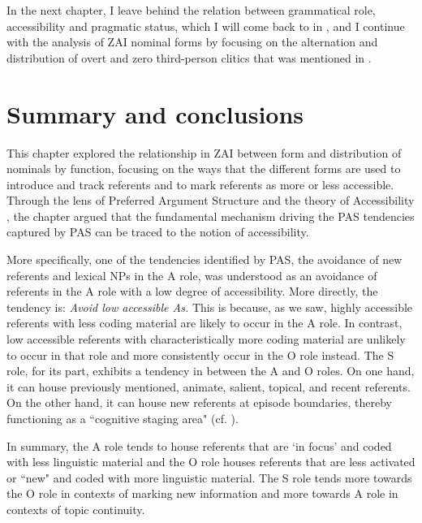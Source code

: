In the next chapter, I leave behind the relation between grammatical role, accessibility and pragmatic status, which I will come back to in , and I continue with the analysis of ZAI nominal forms by focusing on the alternation and distribution of overt and zero third-person clitics that was mentioned in . 




\section{Summary and conclusions}


This chapter explored the relationship in ZAI between form and distribution of nominals by function, focusing on the ways that the different forms are used to introduce and track referents and to mark referents as more or less accessible. Through the lens of Preferred Argument Structure \citep{dubois2003a} and the theory of Accessibility \citep{ariel2001}, the chapter argued that the fundamental mechanism driving the PAS tendencies captured by PAS can be traced to the notion of accessibility. 

More specifically, one of the tendencies identified by PAS, the avoidance of new referents and lexical NPs in the A role, was understood as an avoidance of referents in the A role with a low degree of accessibility. More directly, the tendency is: \textit{Avoid low accessible As.} This is because, as we saw, highly accessible referents with less coding material are likely to occur in the A role. In contrast, low accessible referents with characteristically more coding material are unlikely to occur in that role and more consistently occur in the O role instead. The S role, for its part, exhibits a tendency in between the A and O roles. On one hand, it can house previously mentioned, animate, salient, topical, and recent referents. On the other hand, it can house new referents at episode boundaries, thereby functioning as a ``cognitive staging area" (cf. ).

In summary, the A role tends to house referents that are `in focus' \citep{gundel1993} and coded with less linguistic material and the O role houses referents that are less activated or ``new" and coded with more linguistic material. The S role tends more towards the O role in contexts of marking new information and more towards A role in contexts of topic continuity.

